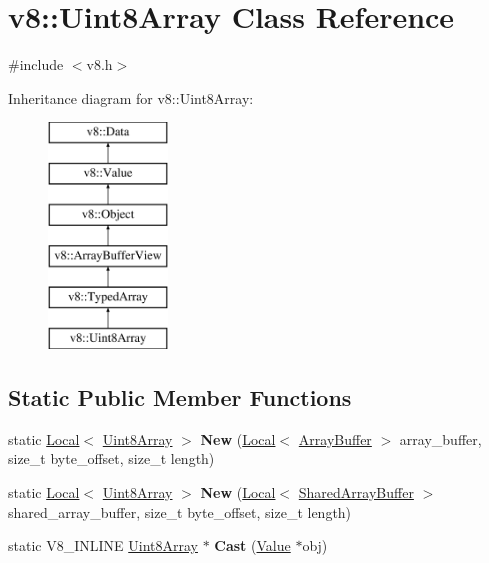 \hypertarget{classv8_1_1_uint8_array}{}\section{v8\+:\+:Uint8\+Array Class Reference}
\label{classv8_1_1_uint8_array}


{\ttfamily \#include $<$v8.\+h$>$}

Inheritance diagram for v8\+:\+:Uint8\+Array\+:\begin{figure}[H]
\begin{center}
\leavevmode
\includegraphics[height=6.000000cm]{classv8_1_1_uint8_array}
\end{center}
\end{figure}
\subsection*{Static Public Member Functions}
\begin{DoxyCompactItemize}
\item 
static \hyperlink{classv8_1_1_local}{Local}$<$ \hyperlink{classv8_1_1_uint8_array}{Uint8\+Array} $>$ {\bfseries New} (\hyperlink{classv8_1_1_local}{Local}$<$ \hyperlink{classv8_1_1_array_buffer}{Array\+Buffer} $>$ array\+\_\+buffer, size\+\_\+t byte\+\_\+offset, size\+\_\+t length)\hypertarget{classv8_1_1_uint8_array_a8262a637cc67c57669adcf5a18bcd29a}{}\label{classv8_1_1_uint8_array_a8262a637cc67c57669adcf5a18bcd29a}

\item 
static \hyperlink{classv8_1_1_local}{Local}$<$ \hyperlink{classv8_1_1_uint8_array}{Uint8\+Array} $>$ {\bfseries New} (\hyperlink{classv8_1_1_local}{Local}$<$ \hyperlink{classv8_1_1_shared_array_buffer}{Shared\+Array\+Buffer} $>$ shared\+\_\+array\+\_\+buffer, size\+\_\+t byte\+\_\+offset, size\+\_\+t length)\hypertarget{classv8_1_1_uint8_array_a07d1f8e3377ddb6af3b423ed0d0f5d26}{}\label{classv8_1_1_uint8_array_a07d1f8e3377ddb6af3b423ed0d0f5d26}

\item 
static V8\+\_\+\+I\+N\+L\+I\+NE \hyperlink{classv8_1_1_uint8_array}{Uint8\+Array} $\ast$ {\bfseries Cast} (\hyperlink{classv8_1_1_value}{Value} $\ast$obj)\hypertarget{classv8_1_1_uint8_array_a3bf7e458abe0be9bc943ba2de6c4f432}{}\label{classv8_1_1_uint8_array_a3bf7e458abe0be9bc943ba2de6c4f432}

\end{DoxyCompactItemize}
